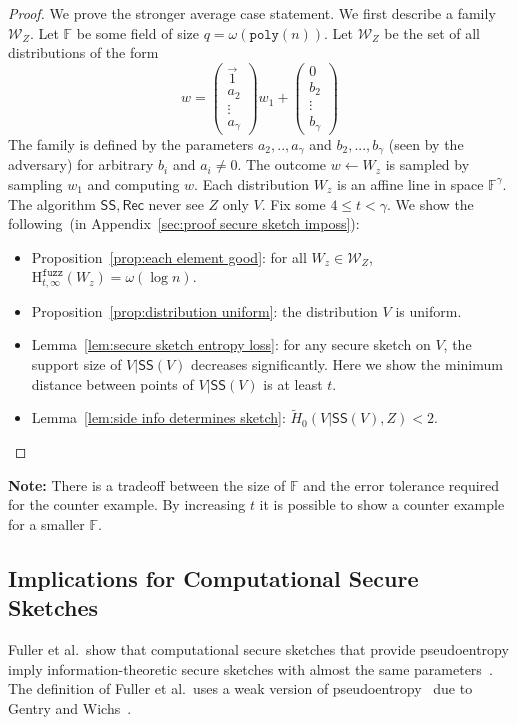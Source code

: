 \documentclass[11pt]{article}
\newcommand{\apref}[1]{\mbox{Appendix~\ref{#1}}}
\newcommand{\lemref}[1]{\mbox{Lemma~\ref{#1}}}
\newcommand{\propref}[1]{\mbox{Proposition~\ref{#1}}}
\newcommand{\class}[1]{{\ensuremath{\mathsf{#1}}}}
\newcommand{\sketch}{\ensuremath{\class{SS}}\xspace}
\newcommand{\rec}{\ensuremath{\class{Rec}}\xspace}
\newcommand{\poly}{\ensuremath{\mathtt{poly}}\xspace}
\newcommand{\Hfuzz}{\mathrm{H}^{\mathtt{fuzz}}_{t,\infty}}
\begin{document}
\begin{proof}
We prove the stronger average case statement.
We first describe a family $\mathcal{W}_Z$.  Let $\mathbb{F}$ be some field of size $q =\omega(\poly(n))$.  
Let $\mathcal{W}_Z$ be the set of all distributions of the form 
\[w =  \begin{pmatrix} \vec{1} \\a_2  \\ \vdots \\ a_{\gamma} \end{pmatrix} w_1 + \begin{pmatrix} 0  \\ 
b_2\\ \vdots \\ b_{\gamma} \end{pmatrix} 
\]
The family is defined by the parameters $a_2,.., a_\gamma$ and $b_2,..., b_\gamma$ (seen by the adversary) for arbitrary $b_i$ and $a_i\neq 0$.  The outcome $w\leftarrow W_z$ is sampled by sampling $w_1$ and computing $w$.  Each distribution $W_z$ is an affine line in space $\mathbb{F}^\gamma$. The algorithm $\sketch, \rec$ never see $Z$ only $ V$.
Fix some $4\le t < \gamma$.
We show the following~(in \apref{sec:proof secure sketch imposs}):

\begin{itemize}
\item \propref{prop:each element good}: for all $W_z\in \mathcal{W}_Z$, $\Hfuzz(W_z) = \omega (\log n)$. 
\item \propref{prop:distribution uniform}: the distribution $V$ is uniform.
\item \lemref{lem:secure sketch entropy loss}: for any secure sketch on $V$, the support size of $V | \sketch(V)$ decreases significantly.  Here we show the minimum distance between points of $V|\sketch(V)$ is at least $t$.
\item \lemref{lem:side info determines sketch}:  $\tilde{H}_0(V | \sketch(V), Z) < 2$.
\end{itemize}
\end{proof}
\noindent
\textbf{Note:} There is a tradeoff between the size of $\mathbb{F}$ and the error tolerance required for the counter example.  By increasing $t$ it is possible to show a counter example for a smaller $\mathbb{F}$.
\subsection{Implications for Computational Secure Sketches}
\label{sec:feas comp sec sketch}
Fuller et al.~show that computational secure sketches that provide pseudoentropy imply information-theoretic secure sketches with almost the same parameters~\cite[Corollary 3.8]{fuller2013computational}.  
The definition of Fuller et al.~uses a weak version of pseudoentropy~\cite{DBLP:journals/siamcomp/HastadILL99} due to Gentry and Wichs~\cite{gentry2011separating}.
\end{document}
